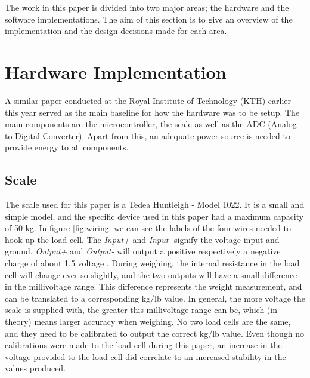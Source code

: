 




The work in this paper is divided into two major areas; the hardware and the software implementations. The aim of this section is to give an overview of the implementation and the design decisions made for each area.

\section{Hardware Implementation}

A similar paper conducted at the Royal Institute of Technology (KTH) earlier this year served as the main baseline for how the hardware was to be setup.\cite{hospital} The main components are the microcontroller, the scale as well as the ADC (Analog-to-Digital Converter). Apart from this, an adequate power source is needed to provide energy to all components. 

\subsection{Scale}
The scale used for this paper is a Tedea Huntleigh - Model 1022. It is a small and simple model, and the specific device used in this paper had a maximum capacity of 50 kg.\cite{load-cell-data} In figure \ref{fig:wiring} we can see the labels of the four wires needed to hook up the load cell. The \textit{Input+} and \textit{Input-} signify the voltage input and ground. \cite{load-cell-spec} \textit{Output+} and \textit{Output-} will output a positive respectively a negative charge of about 1.5 voltage . During weighing, the internal resistance in the load cell will change ever so slightly, and the two outputs will have a small difference in the millivoltage range. This difference represents the weight measurement, and can be translated to a corresponding kg/lb value. In general, the more voltage the scale is supplied with, the greater this millivoltage range can be, which (in theory) means larger accuracy when weighing. No two load cells are the same, and they need to be calibrated to output the correct kg/lb value. Even though no calibrations were made to the load cell during this paper, an increase in the voltage provided to the load cell did correlate to an increased stability in the values produced. 

